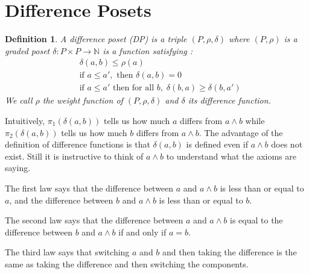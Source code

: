 \documentclass[acmsmall,review,anonymous]{acmart}\settopmatter{printfolios=true,printccs=false,printacmref=false}
\newtheorem{definition}{Definition}
\begin{document}
\section{Difference Posets}
\begin{definition}
A {\em difference poset (DP)} is a triple $(P, \rho, \delta)$ where $(P, \rho)$
is a graded poset $\delta : P \times P \longrightarrow \mathbb{N}$ is a function
satisfying :
\begin{align}
&\delta(a, b) \leq \rho(a)\tag{A1}\\
&\text{if } a \leq a',\text{ then } \delta(a, b) = 0\tag{A2}\\
&\text{if } a \leq a' \text{ then for all }b , \; \delta(b, a) \geq
\delta(b, a')\tag{A3}
\end{align}
We call $\rho$ the weight function of $(P, \rho, \delta)$ and $\delta$ its
difference function.
\end{definition}
\iffalse
Intuitively, $\pi_1(\delta(a, b))$ tells us how much $a$ differs from $a \wedge
b$ while $\pi_2(\delta(a, b))$ tells us how much $b$ differs from $a \wedge b$.
The advantage of the definition of difference functions is that $\delta(a, b)$
is defined even if $a \wedge b$ does not exist. Still it is instructive to
think of $a \wedge b$ to understand what the axioms are saying.

The first law says that the difference between $a$ and $a \wedge b$ is less
than or equal to $a$, and the difference between $b$ and $a \wedge b$
is less than or equal to $b$.

The second law says that the difference between $a$ and $a \wedge b$ is equal
to the difference between $b$ and $a \wedge b$ if and only if $a = b$.

The third law says that switching $a$ and $b$ and then taking the difference
is the same as taking the difference and then switching the components.
\end{document}
